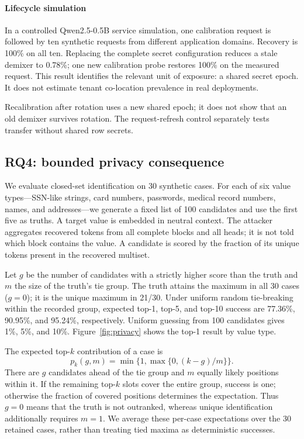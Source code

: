 \paragraph{Lifecycle simulation}
In a controlled Qwen2.5-0.5B service simulation, one calibration request is followed by ten synthetic requests from different application domains. Recovery is 100\% on all ten. Replacing the complete secret configuration reduces a stale demixer to 0.78\%; one new calibration probe restores 100\% on the measured request. This result identifies the relevant unit of exposure: a shared secret epoch. It does not estimate tenant co-location prevalence in real deployments.

Recalibration after rotation uses a new shared epoch; it does not show that an old demixer survives rotation. The request-refresh control separately tests transfer without shared row secrets.

\subsection{RQ4: bounded privacy consequence}
We evaluate closed-set identification on 30 synthetic cases. For each of six value types---SSN-like strings, card numbers, passwords, medical record numbers, names, and addresses---we generate a fixed list of 100 candidates and use the first five as truths. A target value is embedded in neutral context. The attacker aggregates recovered tokens from all complete blocks and all heads; it is not told which block contains the value. A candidate is scored by the fraction of its unique tokens present in the recovered multiset.

Let $g$ be the number of candidates with a strictly higher score than the truth and $m$ the size of the truth's tie group. The truth attains the maximum in all 30 cases ($g=0$); it is the unique maximum in 21/30. Under uniform random tie-breaking within the recorded group, expected top-1, top-5, and top-10 success are 77.36\%, 90.95\%, and 95.24\%, respectively. Uniform guessing from 100 candidates gives 1\%, 5\%, and 10\%. Figure~\ref{fig:privacy} shows the top-1 result by value type.

The expected top-$k$ contribution of a case is
\begin{equation}
 p_k(g,m)=\min\{1,\max\{0,(k-g)/m\}\}.
 \label{eq:ties}
\end{equation}
There are $g$ candidates ahead of the tie group and $m$ equally likely positions within it. If the remaining top-$k$ slots cover the entire group, success is one; otherwise the fraction of covered positions determines the expectation. Thus $g=0$ means that the truth is not outranked, whereas unique identification additionally requires $m=1$. We average these per-case expectations over the 30 retained cases, rather than treating tied maxima as deterministic successes.

